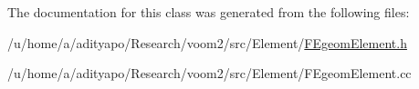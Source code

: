 The documentation for this class was generated from the following files:\begin{DoxyCompactItemize}
\item 
/u/home/a/adityapo/Research/voom2/src/Element/\hyperlink{_f_egeom_element_8h}{FEgeomElement.h}\item 
/u/home/a/adityapo/Research/voom2/src/Element/FEgeomElement.cc\end{DoxyCompactItemize}
